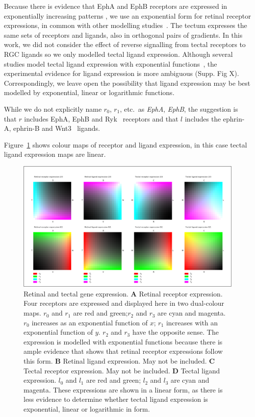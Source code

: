 \documentclass[11pt, a4paper]{article}
\begin{document}
Because there is evidence that EphA and EphB receptors are expressed in
exponentially increasing
patterns \cite{reber_relative_2004,feldheim_genetic_2000,brown_topographic_2000,koulakov_stochastic_2004},
we use an exponential form for retinal receptor expressions, in common with
other modelling
studies~\cite{reber_relative_2004,koulakov_stochastic_2004,simpson_simple_2011}.
%
The tectum expresses the same sets of receptors and ligands, also in
orthogonal pairs of gradients. In this work, we did not consider the effect of
reverse signalling from tectal receptors to RGC ligands so we only modelled
tectal ligand expression. Although
several studies model tectal ligand expression with exponential functions~\cite{koulakov_stochastic_2004}, the
experimental evidence for ligand expression is more ambiguous (Supp. Fig
X). Correspondingly, we leave open the possibility that ligand expression may
be best modelled by exponential, linear or logarithmic functions.

While we do not
explicitly name $r_0$, $r_1$, etc.~as \emph{EphA}, \emph{EphB}, the suggestion
is that $r$ includes EphA, EphB and Ryk~\cite{schmitt_wntryk_2006} receptors
and that $l$ includes the ephrin-A, ephrin-B and
Wnt3~\cite{schmitt_wntryk_2006} ligands.

Figure~\ref{f:1} shows colour maps of receptor and ligand
expression, in this case tectal ligand expression maps are linear.

\begin{figure}
\includegraphics[width=\linewidth]{./images/expressions_fig.png}
\caption{Retinal and tectal gene expression.
%
\textbf{A} Retinal receptor expression. Four receptors are expressed and
displayed here in two dual-colour maps. $r_0$ and $r_1$ are red and
green;$r_2$ and $r_3$ are cyan and magenta. $r_0$ increases as an
exponential function of $x$; $r_1$ increases with an exponential function of
$y$. $r_2$ and $r_3$ have the opposite sense. The expression is modelled with
exponential functions because there is ample evidence that shows that retinal
receptor expressions follow this form.
%
\textbf{B} Retinal ligand expression. May not be included.
%
\textbf{C} Tectal receptor expression. May not be included.
%
\textbf{D} Tectal ligand expression. $l_0$ and $l_1$ are red and green; $l_2$
and $l_3$ are cyan and magenta. These expressions are shown in a linear form,
as there is less evidence to determine whether tectal ligand expression is
exponential, linear or logarithmic in form.
}
\label{f:1}
\end{figure}
\end{document}
